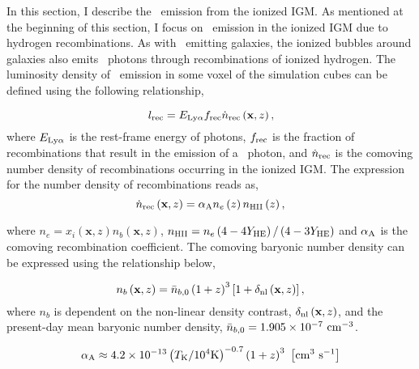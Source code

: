 \label{sec:ionized_igm}

In this section, I describe the \lya\ emission from the ionized IGM. As mentioned
at the beginning of this section, I focus on \lya\ emission in the ionized IGM due to hydrogen recombinations.
As with \lya\ emitting galaxies, the ionized bubbles around galaxies also emits \lya\ photons through
recombinations of ionized hydrogen. The luminosity density of \lya\ emission in
some voxel of the simulation cubes can be defined using the following relationship,

\begin{equation}
  l_{\rm rec} = E_{\rm Ly\alpha} f_{\rm rec} \dot{n}_{\rm rec} \left( \textbf{x}, z \right),
\end{equation}
where $E_{\rm Ly\alpha}$ is the rest-frame energy of \lya photons, $f_{\rm rec}$ is the
fraction of recombinations that result in the emission of a \lya\ photon, and $\dot{n}_{\rm rec}$
is the comoving number density of recombinations occurring in the ionized IGM. The expression for the
number density of recombinations reads as,
\begin{equation}
  \dot{n}_{\rm rec} \left( \textbf{x}, z \right) = \alpha_{\rm A} n_{e} \left(z \right) n_{\textsc{HII}} \left(z \right),
\end{equation}

where $n_{e} = x_i \left( \textbf{x}, z \right) n_{b} \left( \textbf{x}, z \right)$,
$n_{\textsc{HII}} = n_{e} \left(4 - 4 Y_{\rm HE} \right) /  \left(4 - 3 Y_{\rm HE} \right)$ and $\alpha_{\rm A}$
is the comoving recombination coefficient. The comoving baryonic number density can be expressed using the
relationship below,

\begin{equation}
  n_{b} \left( \textbf{x}, z \right) = \bar{n}_{b, 0} \left( 1 + z\right)^3 \left[1 + \delta_{\rm nl} \left( \textbf{x}, z\right) \right],
\end{equation}
where $n_{b}$ is dependent on the non-linear density contrast, $\delta_{\rm nl} \left( \textbf{x}, z\right)$, and the
present-day mean baryonic number density, $\bar{n}_{b, 0} = 1.905 \times 10^{-7} \ \rm{cm}^{-3}$.

\begin{equation}
  \alpha_{\rm A} \approx 4.2 \times 10^{-13} \left( T_{\rm K} / 10^4 {\rm K} \right)^{-0.7} \left( 1 + z\right)^3 \ \left[\rm  cm^3 \ s^{-1} \right]
\end{equation}

